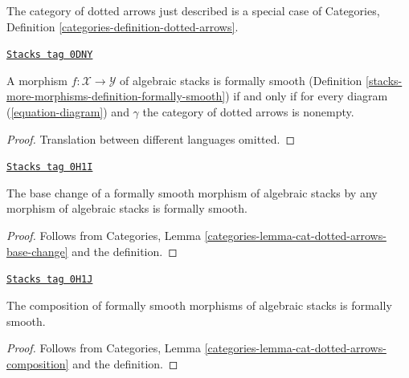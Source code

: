 \medskip\noindent
The category of dotted arrows just described is a special case of
Categories, Definition \ref{categories-definition-dotted-arrows}.

\begin{lemma}
\label{stacks-more-morphisms-lemma-reformulate-formal-smoothness}
\href{https://stacks.math.columbia.edu/tag/0DNY}{\texttt{Stacks tag 0DNY}}

A morphism $f : \mathcal{X} \to \mathcal{Y}$ of algebraic stacks is
formally smooth (Definition \ref{stacks-more-morphisms-definition-formally-smooth})
if and only if for every diagram (\ref{equation-diagram}) and $\gamma$
the category of dotted arrows is nonempty.
\end{lemma}

\begin{proof}
Translation between different languages omitted.
\end{proof}

\begin{lemma}
\label{stacks-more-morphisms-lemma-base-change-formal-smoothness}
\href{https://stacks.math.columbia.edu/tag/0H1I}{\texttt{Stacks tag 0H1I}}

The base change of a formally smooth morphism of algebraic stacks
by any morphism of algebraic stacks is formally smooth.
\end{lemma}

\begin{proof}
Follows from
Categories, Lemma \ref{categories-lemma-cat-dotted-arrows-base-change}
and the definition.
\end{proof}

\begin{lemma}
\label{stacks-more-morphisms-lemma-composition-formal-smoothness}
\href{https://stacks.math.columbia.edu/tag/0H1J}{\texttt{Stacks tag 0H1J}}

The composition of formally smooth morphisms of algebraic stacks
is formally smooth.
\end{lemma}

\begin{proof}
Follows from
Categories, Lemma \ref{categories-lemma-cat-dotted-arrows-composition}
and the definition.
\end{proof}

